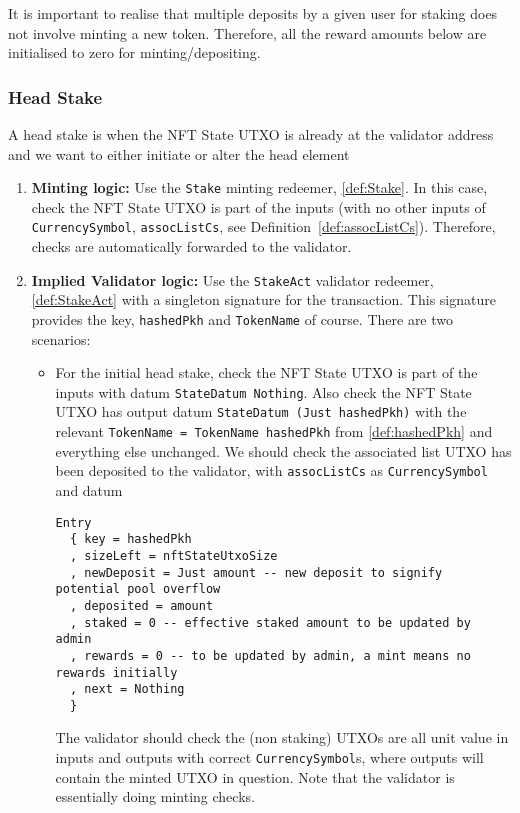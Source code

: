 \documentclass[10pt, a4paper]{article}
\theoremstyle{definition}
\begin{document}
It is important to realise that multiple deposits by a given user for staking does not involve minting a new token. Therefore, all the reward amounts below are initialised to zero for minting/depositing.

\subsubsection{Head Stake}\label{subsubsection:HeadStake}
A head stake is when the NFT State UTXO is already at the validator address and we want to either initiate or alter the head element
\begin{enumerate}
\item{\textbf{Minting logic:} Use the \texttt{Stake} minting redeemer, \ref{def:Stake}. In this case, check the NFT State UTXO is part of the inputs (with no other inputs of \texttt{CurrencySymbol}, \texttt{assocListCs}, see Definition~\ref{def:assocListCs}). Therefore, checks are automatically forwarded to the validator.}
\item{\textbf{Implied Validator logic:} Use the \texttt{StakeAct} validator redeemer, \ref{def:StakeAct} with a singleton signature for the transaction. This signature provides the key, \texttt{hashedPkh} and \texttt{TokenName} of course. There are two scenarios:

\begin{itemize}
\item{For the initial head stake, check the NFT State UTXO is part of the inputs with datum \texttt{StateDatum Nothing}. Also check the NFT State UTXO has output datum \texttt{StateDatum (Just hashedPkh)} with the relevant \texttt{TokenName = TokenName hashedPkh} from \ref{def:hashedPkh} and everything else unchanged. We should check the associated list UTXO has been deposited to the validator, with \texttt{assocListCs} as \texttt{CurrencySymbol} and datum
\begin{verbatim}
Entry
  { key = hashedPkh
  , sizeLeft = nftStateUtxoSize
  , newDeposit = Just amount -- new deposit to signify potential pool overflow
  , deposited = amount
  , staked = 0 -- effective staked amount to be updated by admin
  , rewards = 0 -- to be updated by admin, a mint means no rewards initially
  , next = Nothing
  }
\end{verbatim}
The validator should check the (non staking) UTXOs are all unit value in inputs and outputs with correct \texttt{CurrencySymbol}s, where outputs will contain the minted UTXO in question. Note that the validator is essentially doing minting checks.

}
\end{itemize}}
\end{enumerate}
\end{document}
